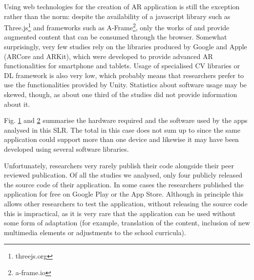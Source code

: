 Using web technologies for the creation of AR application is still the exception rather than the norm: despite the availability of a javascript library such as Three.js\footnote{threejs.org} and frameworks such as A-Frame\footnote{a-frame.io}, only the works of \cite{abriata2020building} and \cite{protopsaltis2016quiz} provide augmented content that can be consumed through the browser.
Somewhat surprisingly, very few studies rely on the libraries produced by Google and Apple (ARCore and ARKit), which were developed to provide advanced \gls{AR} functionalities for smartphone and tablets. Usage of specialised \gls{CV} libraries or \gls{DL} framework is also very low, which probably means that researchers prefer to use the functionalities provided by Unity. Statistics about software usage may be skewed, though, as about one third of the studies did not provide information about it.

Fig. \ref{fig:hardware} and \ref{fig:software} summarise the hardware required and the software used by the apps analysed in this \gls{SLR}. The total in this case does not sum up to \papersSelected since the same application could support more than one device and likewise it may have been developed using several software libraries.

\begin{figure}[htbp]	
	\begin{center}
	
	\captionsetup{font=small}
	\caption{\fontsize{10pt}{11pt}}
	\label{fig:hardware}
    \end{center}
\end{figure}

Unfortunately, researchers very rarely publish their code alongside their peer reviewed publication. Of all the studies we analysed, only four \cite{mylonas2019educational, laviole2018nectar, ManriqueJuan2017APA, abriata2020building} publicly released the source code of their application. In some cases the researchers published the application for free on Google Play or the App Store. Although in principle this allows other researchers to test the application, without releasing the source code this is impractical, as it is very rare that the application can be used without some form of adaptation (for example, translation of the content, inclusion of new multimedia elements or adjustments to the school curricula).

\begin{figure}[htbp]	
	\begin{center}
	
	\captionsetup{font=small}
	\caption{\fontsize{10pt}{11pt}}
	\label{fig:software}
    \end{center}
\end{figure}